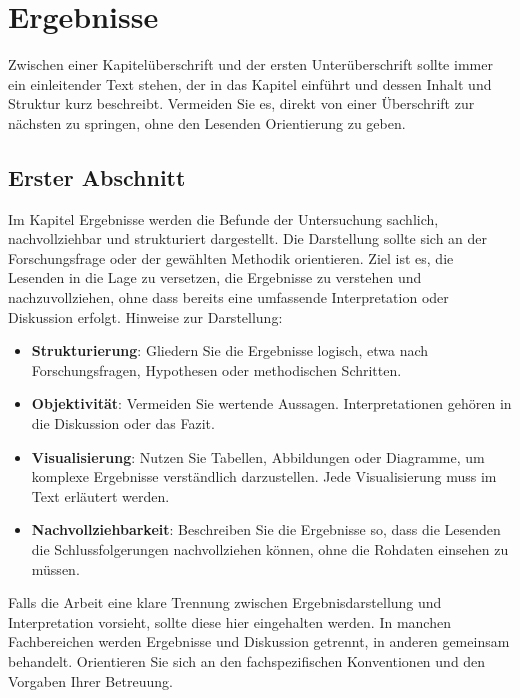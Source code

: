 \chapter{Ergebnisse}

Zwischen einer Kapitelüberschrift und der ersten Unterüberschrift sollte immer ein einleitender Text stehen, der in das Kapitel einführt und dessen Inhalt und Struktur kurz beschreibt. Vermeiden Sie es, direkt von einer Überschrift zur nächsten zu springen, ohne den Lesenden Orientierung zu geben.

\section{Erster Abschnitt}
Im Kapitel \glqq{}Ergebnisse\grqq{} werden die Befunde der Untersuchung sachlich, nachvollziehbar und strukturiert dargestellt. Die Darstellung sollte sich an der Forschungsfrage oder der gewählten Methodik orientieren. Ziel ist es, die Lesenden in die Lage zu versetzen, die Ergebnisse zu verstehen und nachzuvollziehen, ohne dass bereits eine umfassende Interpretation oder Diskussion erfolgt.
Hinweise zur Darstellung:
\begin{itemize}
    \item \textbf{Strukturierung}: Gliedern Sie die Ergebnisse logisch, etwa nach Forschungsfragen, Hypothesen oder methodischen Schritten.
    \item \textbf{Objektivität}: Vermeiden Sie wertende Aussagen. Interpretationen gehören in die Diskussion oder das Fazit.
    \item \textbf{Visualisierung}: Nutzen Sie Tabellen, Abbildungen oder Diagramme, um komplexe Ergebnisse verständlich darzustellen. Jede Visualisierung muss im Text erläutert werden.
    \item \textbf{Nachvollziehbarkeit}: Beschreiben Sie die Ergebnisse so, dass die Lesenden die Schlussfolgerungen nachvollziehen können, ohne die Rohdaten einsehen zu müssen.
\end{itemize}
Falls die Arbeit eine klare Trennung zwischen Ergebnisdarstellung und Interpretation vorsieht, sollte diese hier eingehalten werden. In manchen Fachbereichen werden Ergebnisse und Diskussion getrennt, in anderen gemeinsam behandelt. Orientieren Sie sich an den fachspezifischen Konventionen und den Vorgaben Ihrer Betreuung.